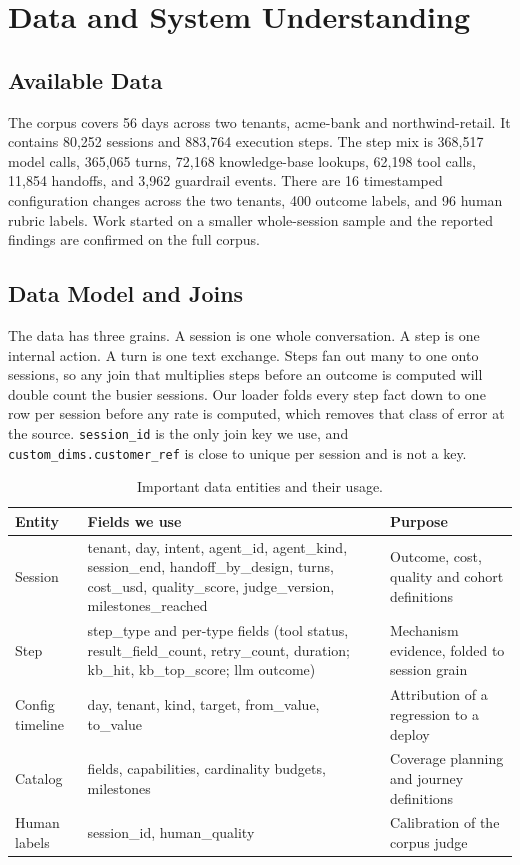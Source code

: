 \documentclass[8pt,twocolumn,a4paper]{extarticle}
\begin{document}
\section{Data and System Understanding}

\subsection{Available Data}

The corpus covers 56 days across two tenants, acme-bank and
northwind-retail. It contains 80,252 sessions and 883,764 execution
steps. The step mix is 368,517 model calls, 365,065 turns, 72,168
knowledge-base lookups, 62,198 tool calls, 11,854 handoffs, and 3,962
guardrail events. There are 16 timestamped configuration changes across
the two tenants, 400 outcome labels, and 96 human rubric labels. Work
started on a smaller whole-session sample and the reported findings are
confirmed on the full corpus.

\subsection{Data Model and Joins}

The data has three grains. A session is one whole conversation. A step
is one internal action. A turn is one text exchange. Steps fan out many
to one onto sessions, so any join that multiplies steps before an
outcome is computed will double count the busier sessions. Our loader
folds every step fact down to one row per session before any rate is
computed, which removes that class of error at the source.
\texttt{session\_id} is the only join key we use, and
\texttt{custom\_dims.customer\_ref} is close to unique per session and is
not a key.

\begin{table}[t]
\centering
\caption{Important data entities and their usage.}
\label{tab:data}
\small
\begin{tabular}{p{}p{}p{}}
\toprule
\textbf{Entity} & \textbf{Fields we use} & \textbf{Purpose} \\
\midrule
Session & tenant, day, intent, agent\_id, agent\_kind, session\_end, handoff\_by\_design, turns, cost\_usd, quality\_score, judge\_version, milestones\_reached & Outcome, cost, quality and cohort definitions \\
Step & step\_type and per-type fields (tool status, result\_field\_count, retry\_count, duration; kb\_hit, kb\_top\_score; llm outcome) & Mechanism evidence, folded to session grain \\
Config timeline & day, tenant, kind, target, from\_value, to\_value & Attribution of a regression to a deploy \\
Catalog & fields, capabilities, cardinality budgets, milestones & Coverage planning and journey definitions \\
Human labels & session\_id, human\_quality & Calibration of the corpus judge \\
\bottomrule
\end{tabular}
\end{table}
\end{document}
